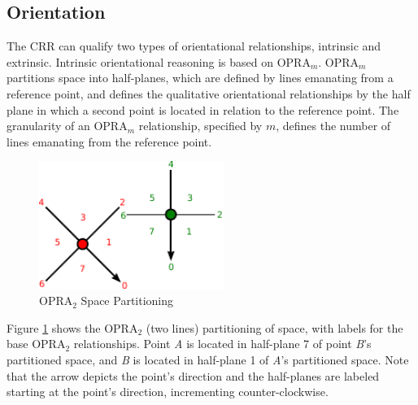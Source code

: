 \documentclass[12pt]{ucthesis}
\begin{document}


\subsection{Orientation} \label{orientation}
The CRR can qualify two types of orientational relationships, intrinsic and extrinsic. Intrinsic orientational reasoning is based on OPRA$_{m}$. OPRA$_{m}$ partitions space into half-planes, which are defined by lines emanating from a reference point, and defines the qualitative orientational relationships by the half plane in which a second point is located in relation to the reference point. The granularity of an OPRA$_{m}$ relationship, specified by $m$, defines the number of lines emanating from the reference point. 

\begin{figure}[H]
\centering
\includegraphics[width=60mm]{facing-opra-base-rel}
\caption{OPRA$_{2}$ Space Partitioning}
\label{facing-opra-base-rel}
\end{figure}

Figure \ref{facing-opra-base-rel} shows the OPRA$_{2}$ (two lines) partitioning of space, with labels for the base OPRA$_{2}$ relationships. Point \emph{A} is located in half-plane 7 of point \emph{B}'s partitioned space, and \emph{B} is located in half-plane 1 of \emph{A}'s partitioned space. Note that the arrow depicts the point's direction and the half-planes are labeled starting at the point's direction, incrementing counter-clockwise. 
\end{document}
